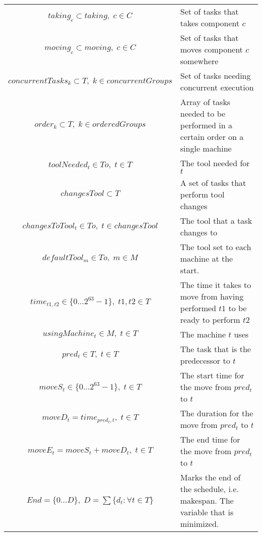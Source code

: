 \documentclass[10pt,a4paper]{report}
\begin{document}
\begin{longtable}{c p{5cm}}
$taking_c \subset taking, \; c \in C$ & Set of tasks that takes component $c$\\

$moving_c \subset moving, \; c \in C$ & Set of tasks that moves component $c$ somewhere \\

$concurrentTasks_k \subset T, \; k \in concurrentGroups$ & Set of tasks needing concurrent execution \\

$order_k \subset T, \; k \in orderedGroups$ & Array of tasks needed to be performed in a certain order on a single machine \\

$toolNeeded_t \in To, \; t \in T$ & The tool needed for $t$ \\

$changesTool \subset T$ & A set of tasks that perform tool changes\\

$changesToTool_t \in To, \; t \in changesTool$ & The tool that a task changes to\\

$defaultTool_m \in To, \; m \in M$ & The tool set to each machine at the start. \\

$time_{t1,t2} \in \{0 \ldots 2^{63}-1\}, \; t1,t2 \in T$ & The time it takes to move from having performed $t1$ to be ready to perform $t2$ \\

$usingMachine_t \in M, \; t \in T$ & The machine $t$ uses \\

$pred_t \in T, \; t \in T$ & The task that is the predecessor to $t$ \\

$moveS_t \in \{0 \ldots 2^{63}-1\}, \; t \in T$ & The start time for the move from $pred_t$ to $t$ \\

$moveD_t = time_{pred_t, t}, \; t \in T$ & The duration for the move from $pred_t$ to $t$ \\

$moveE_t = moveS_t + moveD_t, \; t \in T$ & The end time for the move from $pred_t$ to $t$ \\

$End = \{0 \ldots D\},\; D = \sum\{d_t:\forall t \in T\}$ & Marks the end of the schedule, i.e. makespan. The variable that is minimized.\\

\end{longtable}
\end{document}
